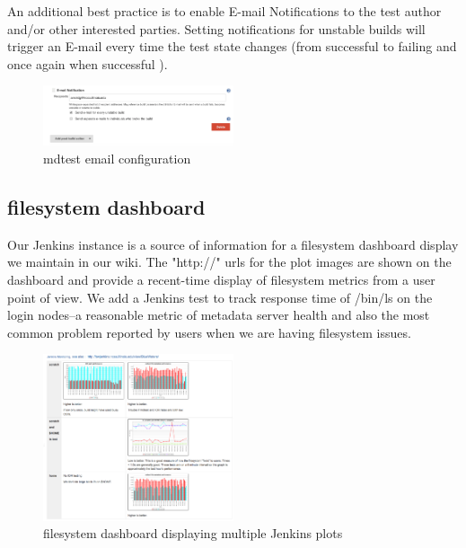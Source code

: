 \documentclass[10pt, conference, compsocconf]{IEEEtran}
\begin{document}
{An additional best practice is to enable E-mail Notifications to the test author and/or other interested parties.  Setting notifications for unstable builds will trigger an E-mail every time the test state changes (from successful to failing and once again when successful ).
\begin{figure}[H]
\centering
\includegraphics[width=0.5\textwidth]{mdtest-config-email}
\caption{ mdtest email configuration }
\label{fig:mdtest-config-email}
\end{figure}

\subsection{filesystem dashboard}
Our Jenkins instance is a source of information for a filesystem dashboard display we maintain in our wiki.  The "http://" urls for the plot images are shown on the dashboard and provide a recent-time display of filesystem metrics from a user point of view.  We add a Jenkins test to track response time of /bin/ls on the login nodes--a reasonable metric of metadata server health and also the most common problem reported by users when we are having filesystem issues.
\begin{figure}[H]
\centering
\includegraphics[width=0.5\textwidth]{wiki-dashboard}
\caption{ filesystem dashboard displaying multiple Jenkins plots }
\label{fig:wiki-dashboard}
\end{figure}

}
\end{document}
